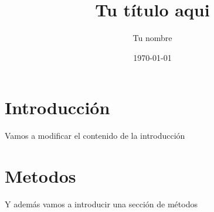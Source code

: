\documentclass{article}
\title{Tu título aqui}
\author{Tu nombre}
\date{\today}
\begin{document}
\maketitle

\section{Introducción}

Vamos a modificar el contenido de la introducción
\section {Metodos}

Y además vamos a introducir una sección de métodos
\end{document}
